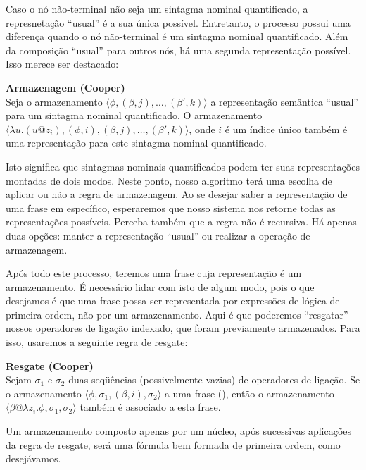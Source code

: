 Caso o nó não-terminal não seja um sintagma nominal quantificado, a represnetação ``usual'' é a sua única possível. Entretanto, o processo possui uma diferença quando o nó não-terminal é um sintagma nominal quantificado. Além da composição ``usual'' para outros nós, há uma segunda representação possível. Isso merece ser destacado:

\begin{oframed}\textbf{Armazenagem (Cooper)}\\
Seja o armazenamento $\langle\phi, (\beta, j), \dots, (\beta', k)\rangle$ a representação semântica ``usual'' para um sintagma nominal quantificado. O armazenamento $\langle\lambda u.(u@z_i), (\phi, i), (\beta, j), \dots, (\beta', k)\rangle $, onde $i$ é um índice único\footnotemark{} também é uma representação para este sintagma nominal quantificado.
\end{oframed}

Isto significa que sintagmas nominais quantificados podem ter suas representações montadas de dois modos. Neste ponto, nosso algoritmo terá uma escolha de aplicar ou não a regra de armazenagem. Ao se desejar saber a representação de uma frase em específico, esperaremos que nosso sistema nos retorne todas as representações possíveis. Perceba também que a regra não é recursiva. Há apenas duas opções: manter a representação ``usual'' ou realizar a operação de armazenagem.

Após todo este processo, teremos uma frase cuja representação é um armazenamento. É necessário lidar com isto de algum modo, pois o que desejamos é que uma frase possa ser representada por expressões de lógica de primeira ordem, não por um armazenamento. Aqui é que poderemos ``resgatar'' nossos operadores de ligação indexado, que foram previamente armazenados. Para isso, usaremos a seguinte regra de resgate:

\begin{oframed} \textbf{Resgate (Cooper)}\\
Sejam $\sigma_1$ e $\sigma_2$ duas seqüências (possivelmente vazias) de operadores de ligação. Se o armazenamento $\langle\phi, \sigma_1, (\beta, i), \sigma_2\rangle$ a uma frase (), então o armazenamento $\langle\beta @ \lambda z_i . \phi , \sigma_1, \sigma_2 \rangle$ também é associado a esta frase.
\end{oframed}

Um armazenamento composto apenas por um núcleo, após sucessivas aplicações da regra de resgate, será uma fórmula bem formada de primeira ordem, como desejávamos.

